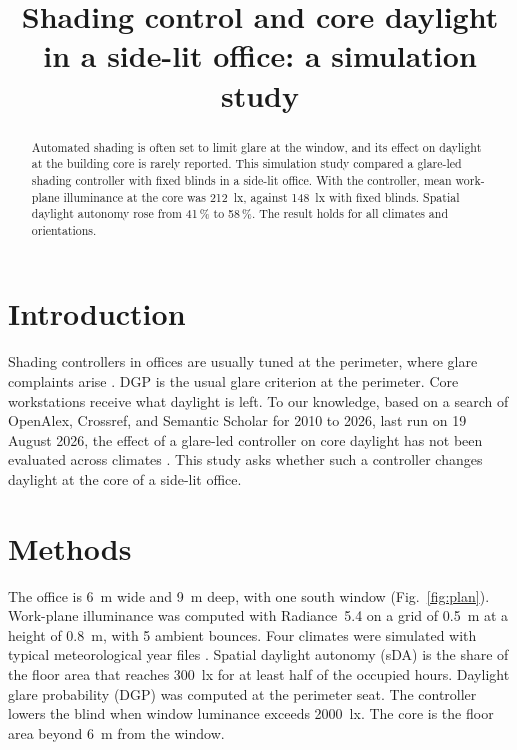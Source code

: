 \documentclass{article}
\begin{document}
\title{Shading control and core daylight in a side-lit office: a simulation study}
\maketitle

\begin{abstract}
Automated shading is often set to limit glare at the window, and its effect on daylight
at the building core is rarely reported. This simulation study compared a glare-led
shading controller with fixed blinds in a side-lit office. With the controller, mean
work-plane illuminance at the core was \SI{212}{\lux}, against \SI{148}{\lux} with fixed
blinds. Spatial daylight autonomy rose from 41\,\% to 58\,\%. The result holds for all climates and orientations.
\end{abstract}

\section{Introduction}
\label{sec:intro}
Shading controllers in offices are usually tuned at the perimeter, where glare
complaints arise \cite{smith2021,lee2022}. DGP is the usual glare criterion at the perimeter. Core workstations receive what daylight is
left. To our knowledge, based on a search of OpenAlex, Crossref, and Semantic Scholar
for 2010 to 2026, last run on 19 August 2026, the effect of a glare-led controller on
core daylight has not been evaluated across climates \cite{okafor2020,nowak2019}. This study asks whether such a controller changes daylight at the
core of a side-lit office.

\section{Methods}
\label{sec:methods}
The office is \SI{6}{\metre} wide and \SI{9}{\metre} deep, with one south window
(Fig.~\ref{fig:plan}). Work-plane illuminance was computed with Radiance~5.4 on a grid
of \SI{0.5}{\metre} at a height of \SI{0.8}{\metre}, with 5 ambient bounces. Four
climates were simulated with typical meteorological year files \cite{cen2019}. Spatial
daylight autonomy (sDA) is the share of the floor area that reaches \SI{300}{\lux} for
at least half of the occupied hours. Daylight glare probability (DGP) was computed at
the perimeter seat. The controller lowers the blind when window luminance exceeds
\SI{2000}{\lux}. The core is the floor area beyond \SI{6}{\metre}
from the window.
\end{document}
